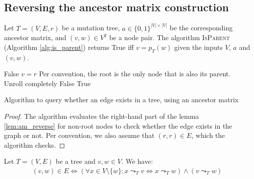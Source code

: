 \subsection{Reversing the ancestor matrix construction}

\begin{theorem}
    \label{theo:am_reverse}
    Let $T=(V, E, r)$ be a mutation tree, $a \in \{0, 1\}^{|V| \times |V|}$ be the corresponding ancestor matrix, and $(v, w) \in V^2$ be a node pair. The algorithm \textsc{IsParent} (Algorithm \ref{alg:is_parent}) returns True iff $v = p_T(w)$ given the inputs $V$, $a$ and $(v,w)$.
\end{theorem}

\begin{algorithm}
    \begin{algorithmic}[1]
                \State \Return False
            \EndIf
                \State \Return $v = r$ \Comment Per convention, the root is the only node that is also its parent.
            \EndIf
             \Comment Unroll completely
                    \State \Return False
                \EndIf
            \EndFor
            \State \Return True
        \EndFunction
    \end{algorithmic}
    \caption{Algorithm to query whether an edge exists in a tree, using an ancestor matrix}
    \label{alg:is_parent}
\end{algorithm}

\begin{proof}
    The algorithm evaluates the right-hand part of the lemma \ref{lem:am_reverse} for non-root nodes to check whether the edge exists in the graph or not. Per convention, we also assume that $(r,r) \in E$, which the algorithm checks.
\end{proof}

\begin{lemma}
    \label{lem:am_reverse}
    Let $T = (V, E)$ be a tree and $v, w \in V$. We have:
    \begin{align*}
        (v, w) \in E \Leftrightarrow (\forall x \in V \setminus \{w\}: x \leadsto_T v \Leftrightarrow x \leadsto_T w) \wedge (v \leadsto_T w)
    \end{align*}
\end{lemma}

